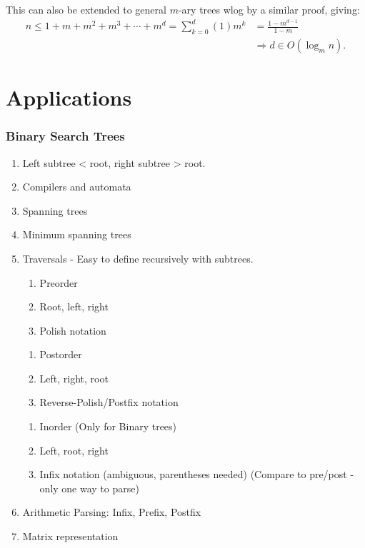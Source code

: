 \documentclass[a4paper,10pt]{report}
\begin{document}
This can also be extended to general $m$-ary trees wlog by a similar proof, giving:
\begin{align*}
	n \leq 1 + m + m^2 + m^3 + \cdots + m^d = \sum_{k=0}^d (1)m^k &=\frac{1-m^{d-1}}{1-m}\\
	&\Rightarrow d \in O(\log_m n).
\end{align*}

\chapter{Applications}
\subsection{Binary Search Trees}
\begin{enumerate}
	\item Left subtree < root, right subtree > root.
	\item Compilers and automata
	\item Spanning trees
	\item Minimum spanning trees
	\item Traversals - Easy to define recursively with subtrees.
	\begin{enumerate}
		\item Preorder
		\item Root, left, right
		\item Polish notation
	\end{enumerate}
	\begin{enumerate}
		\item Postorder
		\item Left, right, root
		\item Reverse-Polish/Postfix notation
	\end{enumerate}
	\begin{enumerate}
		\item Inorder (Only for Binary trees)
		\item Left, root, right
		\item Infix notation (ambiguous, parentheses needed) (Compare to pre/post - only one way to parse)
	\end{enumerate}
	\item Arithmetic Parsing: Infix, Prefix, Postfix
	\item Matrix representation
\end{enumerate}
\end{document}
